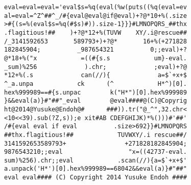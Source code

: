 \documentclass[11pt,a4paper,notitlepage,fleqn]{article}
\begin{document}
\begin{verbatim}
eval=eval=eval='eval$s=%q(eval(%w(puts((%q(eval=ev
al=eval=^Z^##^_/#{eval@eval@if@eval)+?@*10+%(.size
>#{(s=%(eval$s=%q(#$s)#)).size-1}}}#LMNOPQRS_##thx
.flagitious!##    )+?@*12+%(TUVW    XY/.i@rescue##
/_3141592653       589793+)+?@*       16+%(+271828
182845904;          _987654321          0;;eval)+?
@*18+%("x            =((#{s.s            um}-eval.
_sum)%256             ).chr;             ;eval)+?@
*12+%(.s             can(//){             a=$`+x+$
^_a.unpa            ck      (^            H*^)[0].
hex%999989==#{s.unpac        k("H*")[0].hex%999989
}&&eval(a)}#"##"_eval        @eval####@(C)@Copyrig
ht@2014@Yusuke@Endoh@#      ###)).tr("@_^",32.chr<
<10<<39).sub(?Z,s));e xit#AB CDEFGHIJK)*%()))#'##'
/#{eval eval if eval          .size>692}}#LMNOPQRS
##thx.flagitious!##            TUVWXY/.i rescue##/
3141592653589793+                +271828182845904;
9876543210;;eval                  "x=((42737-eval.
sum)%256).chr;;eval            .scan(//){a=$`+x+$'
a.unpack('H*')[0].hex%999989==68042&&eval(a)}#"##"
eval eval#### (C) Copyright 2014 Yusuke Endoh ####
\end{verbatim}
\end{document}
